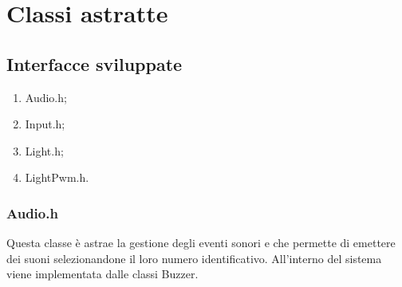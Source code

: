 \chapter{Classi astratte}
\section{Interfacce sviluppate}
\begin{enumerate}
	\item Audio.h;
	\item Input.h;
	\item Light.h;
	\item LightPwm.h.
\end{enumerate}

\subsection{Audio.h}
Questa classe è astrae la gestione degli eventi sonori e che permette di emettere dei suoni selezionandone il loro numero identificativo. All'interno del sistema viene implementata dalle classi Buzzer.
